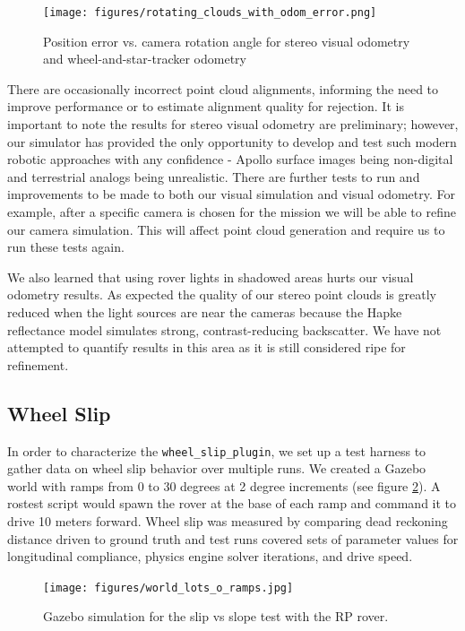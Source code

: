 \documentclass[twocolumn,letterpaper]{IEEEAerospaceCLS}  %
\begin{document}
\begin{figure}[h!]
	\texttt{[image: figures/rotating\_clouds\_with\_odom\_error.png]}
    \caption{Position error vs. camera rotation angle for stereo visual odometry and wheel-and-star-tracker odometry}
    \label{fig:odom_error}
\end{figure}

There are occasionally incorrect point cloud alignments, informing the need to improve performance or to estimate alignment quality for rejection.
It is important to note the results for stereo visual odometry are preliminary; however, our simulator has provided the only opportunity to develop and test such modern robotic approaches with any confidence - Apollo surface images being non-digital and terrestrial analogs being unrealistic.   
There are further tests to run and improvements to be made to both our visual simulation and visual odometry. 
For example, after a specific camera is chosen for the mission we will be able to refine our camera simulation. 
This will affect point cloud generation and require us to run these tests again.

We also learned that using rover lights in shadowed areas hurts our visual odometry results. 
As expected the quality of our stereo point clouds is greatly reduced when the light sources are near the cameras because the Hapke reflectance model simulates strong, contrast-reducing backscatter. 
We have not attempted to quantify results in this area as it is still considered ripe for refinement.

\subsection{Wheel Slip}
In order to characterize the \texttt{wheel\_slip\_plugin}, we set up a test harness to gather data on wheel slip behavior over multiple runs. 
We created a Gazebo world with ramps from 0 to 30 degrees at 2 degree increments (see figure \ref{fig:simulationramps}). 
A rostest script would spawn the rover at the base of each ramp and command it to drive 10 meters forward.
Wheel slip was measured by comparing dead reckoning distance driven to ground truth and test runs covered sets of parameter values for longitudinal compliance, physics engine solver iterations, and drive speed. 
\begin{figure}[h!]
	\texttt{[image: figures/world\_lots\_o\_ramps.jpg]}
   	\caption{Gazebo simulation for the slip vs slope test with the RP rover.}
    \label{fig:simulationramps}
\end{figure}
\end{document}
